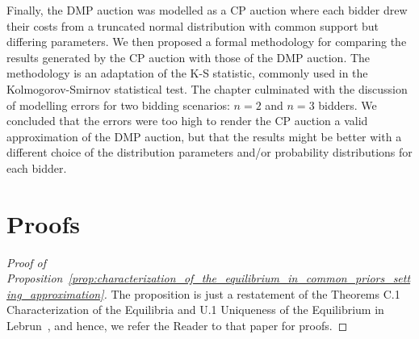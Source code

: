 Finally, the DMP auction was modelled as a CP auction where each bidder drew their costs from a truncated normal distribution with common support but differing parameters. We then proposed a formal methodology for comparing the results generated by the CP auction with those of the DMP auction. The methodology is an adaptation of the K-S statistic, commonly used in the Kolmogorov-Smirnov statistical test. The chapter culminated with the discussion of modelling errors for two bidding scenarios: $n=2$ and $n=3$ bidders. We concluded that the errors were too high to render the CP auction a valid approximation of the DMP auction, but that the results might be better with a different choice of the distribution parameters and/or probability distributions for each bidder.

\section{Proofs} %
\label{sec:proofs_approximation}
\begin{proof}[Proof of Proposition~\ref{prop:characterization_of_the_equilibrium_in_common_priors_setting_approximation}]
The proposition is just a restatement of the Theorems C.1 Characterization of the Equilibria and U.1 Uniqueness of the Equilibrium in Lebrun~\cite{Lebrun2006}, and hence, we refer the Reader to that paper for proofs.
\end{proof}
